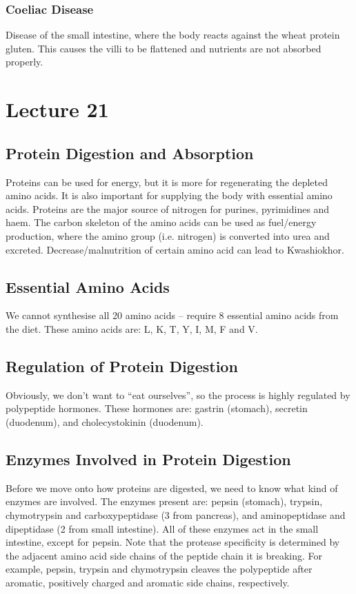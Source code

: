 \documentclass[a4paper, 12pt]{report}
\newcommand{\mychapter}[2]{
    \setcounter{chapter}{#1}
    \setcounter{section}{0}
    \chapter*{#2}
    \addcontentsline{toc}{chapter}{#2}
}
\begin{document}
\subsection{Coeliac Disease}

Disease of the small intestine, where the body reacts against the wheat protein gluten.
This causes the villi to be flattened and nutrients are not absorbed properly.

\mychapter{21}{Lecture 21}

\section{Protein Digestion and Absorption}

Proteins can be used for energy, but it is more for regenerating the depleted amino acids.
It is also important for supplying the body with essential amino acids.
Proteins are the major source of nitrogen for purines, pyrimidines and haem.
The carbon skeleton of the amino acids can be used as fuel/energy production, where the amino group (i.e. nitrogen) is converted into urea and excreted.
Decrease/malnutrition of certain amino acid can lead to Kwashiokhor.

\section{Essential Amino Acids}

We cannot synthesise all 20 amino acids -- require 8 essential amino acids from the diet.
These amino acids are: L, K, T, Y, I, M, F and V.

\section{Regulation of Protein Digestion}

Obviously, we don't want to ``eat ourselves'', so the process is highly regulated by polypeptide hormones.
These hormones are: gastrin (stomach), secretin (duodenum), and cholecystokinin (duodenum).

\section{Enzymes Involved in Protein Digestion}

Before we move onto how proteins are digested, we need to know what kind of enzymes are involved.
The enzymes present are: pepsin (stomach), trypsin, chymotrypsin and carboxypeptidase (3 from pancreas), and aminopeptidase and dipeptidase (2 from small intestine).
All of these enzymes act in the small intestine, except for pepsin.
Note that the protease specificity is determined by the adjacent amino acid side chains of the peptide chain it is breaking.
For example, pepsin, trypsin and chymotrypsin cleaves the polypeptide after aromatic, positively charged and aromatic side chains, respectively.
\end{document}
